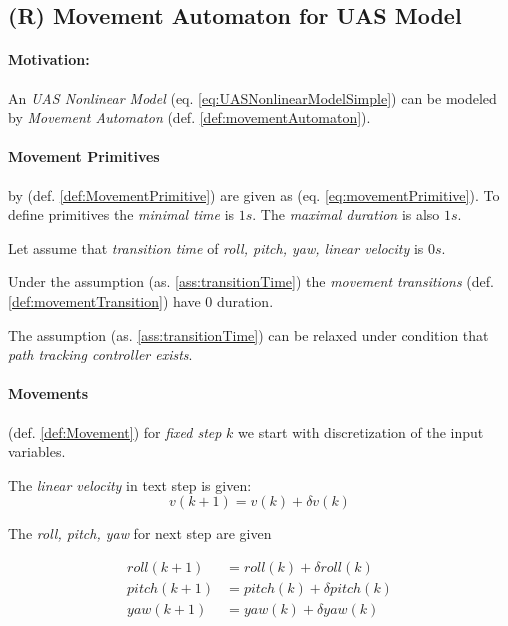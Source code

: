\subsection{(R) Movement Automaton for UAS Model}\label{s:movementAutomatonDefinition}

\paragraph{Motivation:} An \emph{UAS Nonlinear Model} (eq. \ref{eq:UASNonlinearModelSimple}) can be modeled by \emph{Movement Automaton} (def. \ref{def:movementAutomaton}). 

\paragraph{Movement Primitives} by (def. \ref{def:MovementPrimitive})  are given as (eq. \ref{eq:movementPrimitive}). To define primitives the \emph{minimal time} is $1 s$. The \emph{maximal duration} is also $1s$. 

\begin{assumption}\label{ass:transitionTime}
    Let assume that \emph{transition time} of \emph{roll, pitch, yaw, linear velocity} is $0 s$.
\end{assumption}

Under the assumption (as. \ref{ass:transitionTime}) the \emph{movement transitions} (def. \ref{def:movementTransition}) have $0$ duration.

\begin{note}
    The assumption (as. \ref{ass:transitionTime}) can be relaxed under condition that \emph{path tracking controller exists}.
\end{note}

\paragraph{Movements} (def. \ref{def:Movement}) for \emph{fixed step} $k$ we start with discretization of the input variables.

The \emph{linear velocity} in text step is given:
\begin{equation}\label{eq:applyMovement}
    v(k+1) = v(k) +\delta v(k)
\end{equation}

The \emph{roll, pitch, yaw} for next step are given 

\begin{equation}\label{eq:applyMovement1}
    \begin{aligned}
        roll(k+1)  &= roll(k) + \delta roll(k)\\
        pitch(k+1) & = pitch(k) + \delta pitch(k)\\
        yaw(k+1) & = yaw(k) + \delta yaw(k)\\
    \end{aligned}    
\end{equation}

